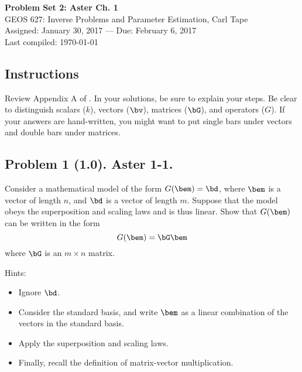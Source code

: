 \documentclass[11pt,titlepage,fleqn]{article}
\begin{document}

\begin{spacing}{1.2}
\centering
{\large \bf Problem Set 2: Aster Ch. 1} \\
GEOS 627: Inverse Problems and Parameter Estimation, Carl Tape \\
Assigned: January 30, 2017 --- Due: February 6, 2017 \\
Last compiled: \today
\end{spacing}


\subsection*{Instructions}

Review Appendix A of \citet{AsterE2}. In your solutions, be sure to explain your steps. Be clear to distinguish scalars ($k$), vectors ($\bv$), matrices ($\bG$), and operators ($G$). If your answers are hand-written, you might want to put single bars under vectors and double bars under matrices.

\subsection*{Problem 1 (1.0). Aster 1-1.}

Consider a mathematical model of the form $G(\bem) = \bd$, where $\bem$ is a vector of length $n$, and $\bd$ is a vector of length $m$. Suppose that the model obeys the superposition and scaling laws and is thus linear. Show that $G(\bem)$ can be written in the form
%
\begin{equation}
G(\bem) = \bG\bem
\end{equation}
%
where $\bG$ is an $m \times n$ matrix.

\medskip\noindent
Hints:
%
\begin{itemize}
\item Ignore $\bd$.
\item Consider the standard basis, and write $\bem$ as a linear combination of the vectors in the standard basis.
\item Apply the superposition and scaling laws.
\item Finally, recall the definition of matrix-vector multiplication.
\end{itemize}

\end{document}
